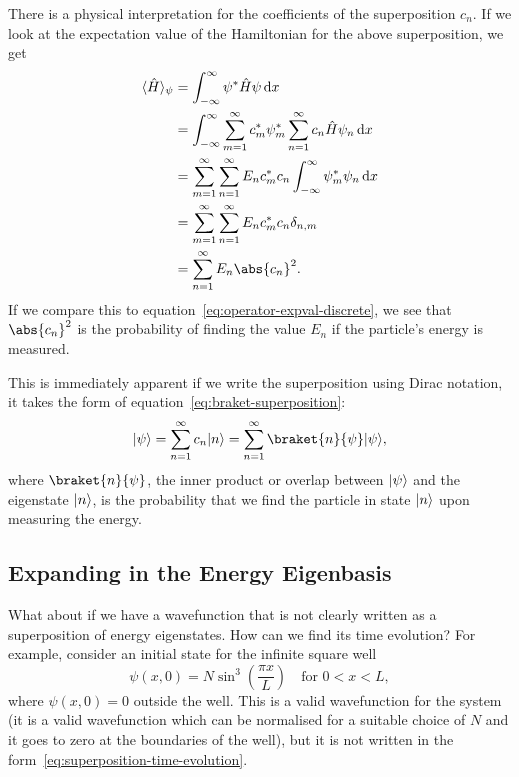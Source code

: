 \documentclass[../quantum_mechanics.tex]{subfiles}
\begin{document}
            There is a physical interpretation for the coefficients of the superposition $c_n$.
            If we look at the expectation value of the Hamiltonian for the above superposition, we get
            \begin{align}
                \langle\hat{H}\rangle_\psi&=\int_{-\infty}^\infty\psi^\ast\hat{H}\psi\dd{x}\\
                &=\int_{-\infty}^\infty\sum_{m=1}^\infty c_m^\ast\psi_m^\ast\sum_{n=1}^\infty c_n\hat{H}\psi_n\dd{x}\\
                &=\sum_{m=1}^\infty\sum_{n=1}^\infty E_nc_m^\ast c_n\int_{-\infty}^\infty\psi_m^\ast\psi_n\dd{x}\\
                &=\sum_{m=1}^\infty\sum_{n=1}^\infty E_nc_m^\ast c_n\delta_{n,m}\\
                &=\sum_{n=1}^\infty E_n\abs{c_n}^2.
            \end{align}
            If we compare this to equation~\ref{eq:operator-expval-discrete}, we see that $\abs{c_n}^2$ is the probability of finding the value $E_n$ if the particle's energy is measured. 

            This is immediately apparent if we write the superposition using Dirac notation, it takes the form of equation~\ref{eq:braket-superposition}:
            \begin{equation}\label{eq:isw-braket-superposition}
                \ket{\psi}=\sum_{n=1}^\infty c_n\ket{n}=\sum_{n=1}^\infty\braket{n}{\psi}\ket{\psi},
            \end{equation}
            where $\braket{n}{\psi}$, the inner product or overlap between $\lvert\psi\rangle$ and the eigenstate $\lvert n\rangle$, is the probability that we find the particle in state $\lvert n\rangle$ upon measuring the energy.

        \subsection{Expanding in the Energy Eigenbasis}\label{sec:properties-of-energy-eigenstates:subsec:expanding-in-the-energy-eigenbasis}
            What about if we have a wavefunction that is not clearly written as a superposition of energy eigenstates.
            How can we find its time evolution?
            For example, consider an initial state for the infinite square well
            \begin{equation}
                \psi(x,0)=N\sin^3\left(\frac{\pi x}{L}\right)\quad\text{for }0<x<L,
            \end{equation}
            where $\psi(x,0)=0$ outside the well.
            This is a valid wavefunction for the system (it is a valid wavefunction which can be normalised for a suitable choice of $N$ and it goes to zero at the boundaries of the well), but it is not written in the form~\ref{eq:superposition-time-evolution}.
            
\end{document}

